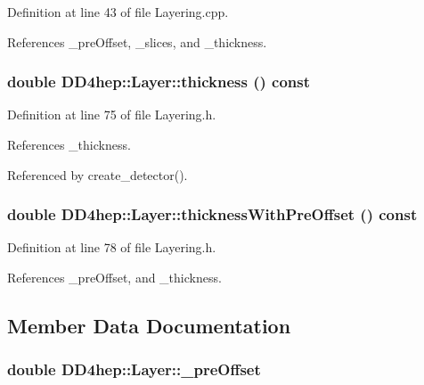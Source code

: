 Definition at line 43 of file Layering.cpp.

References \_\-preOffset, \_\-slices, and \_\-thickness.\hypertarget{class_d_d4hep_1_1_layer_a6dbbae6999664e05a6e0217622c4f099}{
\subsubsection[{thickness}]{\setlength{\rightskip}{0pt plus 5cm}double DD4hep::Layer::thickness () const}}
\label{class_d_d4hep_1_1_layer_a6dbbae6999664e05a6e0217622c4f099}


Definition at line 75 of file Layering.h.

References \_\-thickness.

Referenced by create\_\-detector().\hypertarget{class_d_d4hep_1_1_layer_a65c459b750a25cff5e86b8bcc1048b02}{
\subsubsection[{thicknessWithPreOffset}]{\setlength{\rightskip}{0pt plus 5cm}double DD4hep::Layer::thicknessWithPreOffset () const}}
\label{class_d_d4hep_1_1_layer_a65c459b750a25cff5e86b8bcc1048b02}


Definition at line 78 of file Layering.h.

References \_\-preOffset, and \_\-thickness.

\subsection{Member Data Documentation}
\hypertarget{class_d_d4hep_1_1_layer_a1160c69a0ac9822a0cc9c0c0c7ceac73}{
\subsubsection[{\_\-preOffset}]{\setlength{\rightskip}{0pt plus 5cm}double {\bf DD4hep::Layer::\_\-preOffset}}}
\label{class_d_d4hep_1_1_layer_a1160c69a0ac9822a0cc9c0c0c7ceac73}


